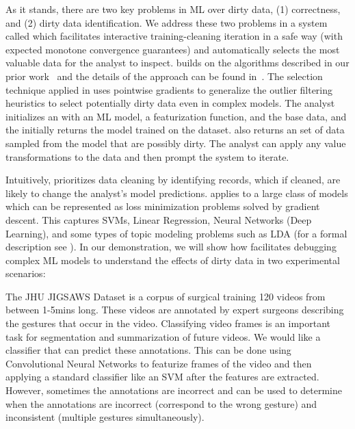 As it stands, there are two key problems in ML over dirty data, (1) correctness, and (2) dirty data identification.
We address these two problems in a system called \sys which facilitates interactive training-cleaning iteration in a safe way (with expected monotone convergence guarantees) and automatically selects the most valuable data for the analyst to inspect.
\sys builds on the algorithms described in our prior work~\cite{krishnan2015svc, wang1999sample, DBLP:journals/pvldb/HaasKWF015, DBLP:journals/debu/KrishnanWFGKM015} and the details of the approach can be found in~\cite{activecleanarxiv}.
The selection technique applied in \sys uses pointwise gradients to generalize the outlier filtering heuristics to select potentially dirty data even in complex models. 
The analyst initializes an \sys with an ML model, a featurization function, and the base data, and the \sys initially returns the model trained on the dataset.
\sys also returns an set of data sampled from the model that are possibly dirty.
The analyst can apply any value transformations to the data and then prompt the system to iterate. 

Intuitively, \sys prioritizes data cleaning by identifying records, which if cleaned, are likely to change the analyst's model predictions.
\sys applies to a large class of models which can be represented as loss minimization problems solved by gradient descent.
This captures SVMs, Linear Regression, Neural Networks (Deep Learning), and some types of topic modeling problems such as LDA (for a formal description see \cite{activecleanarxiv}).
In our demonstration, we will show how \sys facilitates debugging complex ML models to understand the effects of dirty data in two experimental scenarios: 

\begin{example}\sloppy
The JHU JIGSAWS Dataset is a corpus of surgical training 120 videos from between 1-5mins long.
These videos are annotated by expert surgeons describing the gestures that occur in the video. 
Classifying video frames is an important task for segmentation and summarization of future videos.
We would like a classifier that can predict these annotations.
This can be done using Convolutional Neural Networks to featurize frames of the video and then applying a standard classifier like an SVM after the features are extracted.
However, sometimes the annotations are incorrect and \sys can be used to determine when the annotations are incorrect (correspond to the wrong gesture) and inconsistent (multiple gestures simultaneously).
\end{example}

